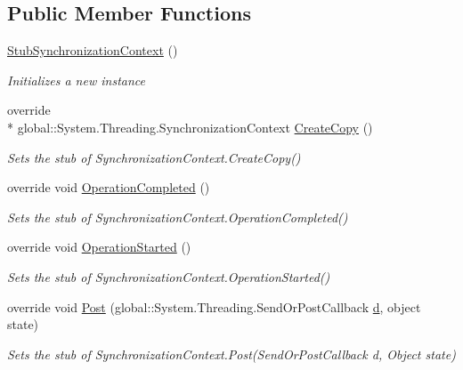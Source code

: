 \subsection*{Public Member Functions}
\begin{DoxyCompactItemize}
\item 
\hyperlink{class_system_1_1_threading_1_1_fakes_1_1_stub_synchronization_context_ab47ba7d0a4b31996b91d85e5a497f5f1}{Stub\-Synchronization\-Context} ()
\begin{DoxyCompactList}\small\item\em Initializes a new instance\end{DoxyCompactList}\item 
override \\*
global\-::\-System.\-Threading.\-Synchronization\-Context \hyperlink{class_system_1_1_threading_1_1_fakes_1_1_stub_synchronization_context_a48ce193033bfd28b2d699f2d1674431d}{Create\-Copy} ()
\begin{DoxyCompactList}\small\item\em Sets the stub of Synchronization\-Context.\-Create\-Copy()\end{DoxyCompactList}\item 
override void \hyperlink{class_system_1_1_threading_1_1_fakes_1_1_stub_synchronization_context_a1f892105550b3d5b0bc81364d9711bd3}{Operation\-Completed} ()
\begin{DoxyCompactList}\small\item\em Sets the stub of Synchronization\-Context.\-Operation\-Completed()\end{DoxyCompactList}\item 
override void \hyperlink{class_system_1_1_threading_1_1_fakes_1_1_stub_synchronization_context_a5f5b324c9e9674c0232e0e2475863d83}{Operation\-Started} ()
\begin{DoxyCompactList}\small\item\em Sets the stub of Synchronization\-Context.\-Operation\-Started()\end{DoxyCompactList}\item 
override void \hyperlink{class_system_1_1_threading_1_1_fakes_1_1_stub_synchronization_context_ada1356de159a52325bd753c232a1449e}{Post} (global\-::\-System.\-Threading.\-Send\-Or\-Post\-Callback \hyperlink{bootstrap_8min_8js_aeb337d295abaddb5ec3cb34cc2e2bbc9}{d}, object state)
\begin{DoxyCompactList}\small\item\em Sets the stub of Synchronization\-Context.\-Post(\-Send\-Or\-Post\-Callback d, Object state)\end{DoxyCompactList}\item 

\end{DoxyCompactItemize}
